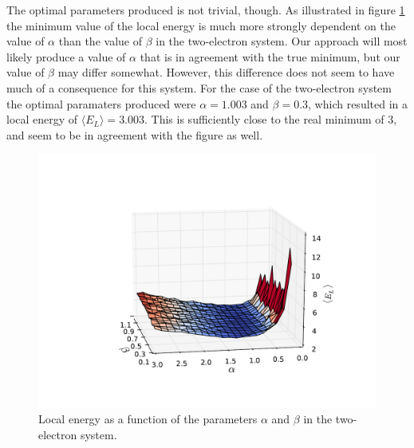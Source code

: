 \documentclass[english, a4paper]{article}
\newcommand\bk[1]{\langle#1\rangle}
\begin{document}
	The optimal parameters produced is not trivial, though. As illustrated in figure \ref{fig:energyPlot15x15N2} the minimum value of the local energy is much more strongly dependent on the value of $\alpha$ than the value of $\beta$ in the two-electron system. Our approach will most likely produce a value of $\alpha$ that is in agreement with the true minimum, but our value of $\beta$ may differ somewhat. However, this difference does not seem to have much of a consequence for this system. For the case of the two-electron system the optimal paramaters produced were $\alpha=1.003$ and $\beta=0.3$, which resulted in a local energy of $\bk{E_L} = 3.003$. This is sufficiently close to the real minimum of 3, and seem to be in agreement with the figure as well.
	
	
	
\begin{figure}[H]
\centering
\includegraphics[width=0.8\linewidth, trim={0 2cm 0 4.5cm}, clip]{figures/energySurface/energyPlot15x15N2}
\caption{Local energy as a function of the parameters $\alpha$ and $\beta$ in the two-electron system.}
\label{fig:energyPlot15x15N2}
\end{figure}
	
	
	
\end{document}
